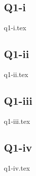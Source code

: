 \documentclass[crop=false,fleqn]{standalone}
\begin{document}
    \subsection*{Q1-i}
    {q1-i.tex}

    \subsection*{Q1-ii}
    {q1-ii.tex}

    \subsection*{Q1-iii}
    {q1-iii.tex}

    \subsection*{Q1-iv}
    {q1-iv.tex}
\end{document}
